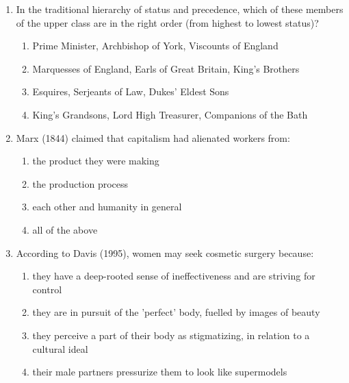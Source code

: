 \documentclass[12pt]{article}
\begin{document}
\begin{enumerate}[label=\arabic*.]
\item In the traditional hierarchy of status and precedence, which of these members of the upper class are in the right order (from highest to lowest status)?
\begin{enumerate}[label=(\alph*)]
    \item Prime Minister, Archbishop of York, Viscounts of England
    \item Marquesses of England, Earls of Great Britain, King's Brothers
    \item Esquires, Serjeants of Law, Dukes' Eldest Sons
    \item King's Grandsons, Lord High Treasurer, Companions of the Bath
\end{enumerate}
\item Marx (1844) claimed that capitalism had alienated workers from:
\begin{enumerate}[label=(\alph*)]
    \item the product they were making
    \item the production process
    \item each other and humanity in general
    \item all of the above
\end{enumerate}
\item According to Davis (1995), women may seek cosmetic surgery because:
\begin{enumerate}[label=(\alph*)]
    \item they have a deep-rooted sense of ineffectiveness and are striving for control
    \item they are in pursuit of the 'perfect' body, fuelled by images of beauty
    \item they perceive a part of their body as stigmatizing, in relation to a cultural ideal
    \item their male partners pressurize them to look like supermodels
\end{enumerate}
\end{enumerate}
\end{document}
